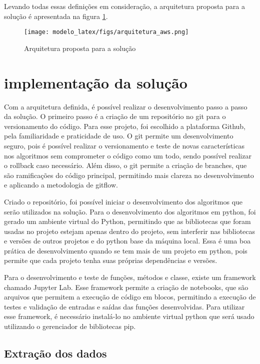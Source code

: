 Levando todas essas definições em consideração, a arquitetura proposta para a solução é apresentada na figura \ref{fig:arquitetura_aws}.

\begin{figure}[H]
    \centering
    \texttt{[image: modelo\_latex/figs/arquitetura\_aws.png]}
    \caption{Arquitetura proposta para a solução}
    \label{fig:arquitetura_aws}
\end{figure}


\section{implementação da solução}

Com a arquitetura definida, é possível realizar o desenvolvimento passo a passo da solução. O primeiro passo é a criação de um repositório no git para o versionamento do código. Para esse projeto, foi escolhido a plataforma Github, pela familiaridade e praticidade de uso. O git permite um desenvolvimento seguro, pois é possível realizar o versionamento e teste de novas características nos algoritmos sem comprometer o código como um todo, sendo possível realizar o rollback caso necessário. Além disso, o git permite a criação de branches, que são ramificações do código principal, permitindo mais clareza no desenvolvimento e aplicando a metodologia de gitflow.

Criado o repositório, foi possível iniciar o desenvolvimento dos algoritmos que serão utilizados na solução.
Para o desenvolvimento dos algoritmos em python, foi gerado um ambiente virtual do Python, permitindo que as bibliotecas que foram usadas no projeto estejam apenas dentro do projeto, sem interferir nas bibliotecas e versões de outros projetos e do python base da máquina local. Essa é uma boa prática de desenvolvimento quando se tem mais de um projeto em python, pois permite que cada projeto tenha suas próprias dependências e versões.

Para o desenvolvimento e teste de funções, métodos e classe, existe um framework chamado Jupyter Lab. Esse framework permite a criação de notebooks, que são arquivos que permitem a execução de código em blocos, permitindo a execução de testes e validação de entradas e saídas das funções desenvolvidas. Para utilizar esse framework, é necessário instalá-lo no ambiente virtual python que será usado utilizando o gerenciador de bibliotecas pip.

\subsection{Extração dos dados}

